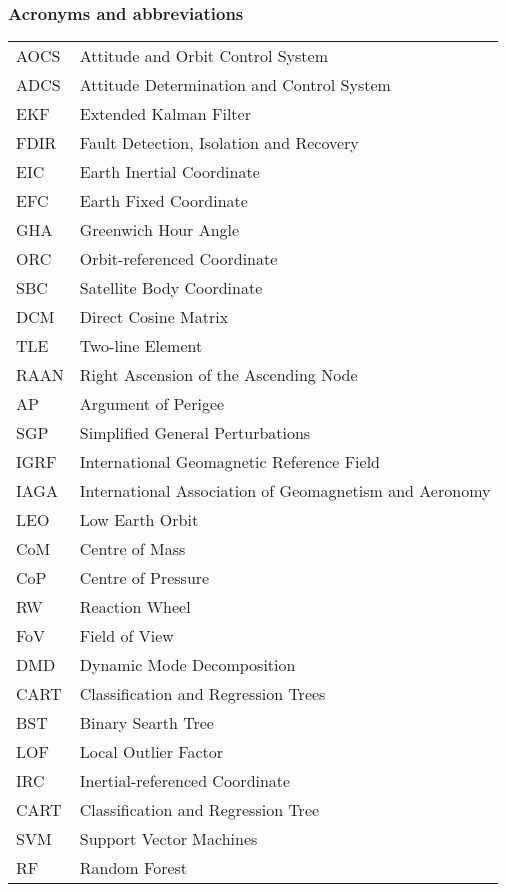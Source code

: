 \newpage
\subsubsection*{Acronyms and abbreviations}

\begingroup
\renewcommand{\arraystretch}{1.2}
\begin{tabular}{@{}p{2.5cm} l}
    AOCS	& Attitude and Orbit Control System \\
    ADCS	& Attitude Determination and Control System \\
    EKF		& Extended Kalman Filter \\
    FDIR	& Fault Detection, Isolation and Recovery \\
    EIC		& Earth Inertial Coordinate \\
    EFC		& Earth Fixed Coordinate \\
    GHA 	& Greenwich Hour Angle \\
    ORC 	& Orbit-referenced Coordinate \\
    SBC 	& Satellite Body Coordinate \\
    DCM 	& Direct Cosine Matrix \\
    TLE 	& Two-line Element \\
    RAAN	& Right Ascension of the Ascending Node \\
    AP		& Argument of Perigee \\
    SGP 	& Simplified General Perturbations \\
    IGRF	& International Geomagnetic Reference Field \\
    IAGA	& International Association of Geomagnetism and Aeronomy \\
    LEO		& Low Earth Orbit \\
    CoM		& Centre of Mass \\
    CoP 	& Centre of Pressure \\
    RW		& Reaction Wheel \\
    FoV		& Field of View \\
    DMD 	& Dynamic Mode Decomposition \\    
    CART	& Classification and Regression Trees \\
    BST		& Binary Searth Tree \\
    LOF		& Local Outlier Factor \\
    IRC		& Inertial-referenced Coordinate \\
    CART	& Classification and Regression Tree \\
    SVM		& Support Vector Machines \\
    RF		& Random Forest \\
    
\end{tabular}
\endgroup
